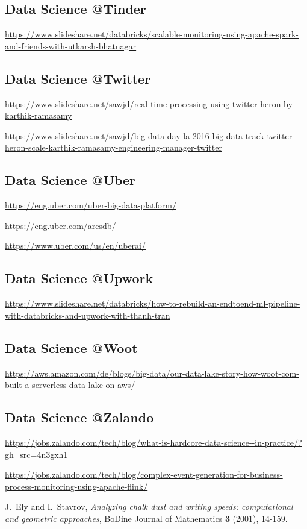 \documentclass[12pt]{scrartcl} %
\begin{document}
\subsection{Data Science @Tinder}
\url{https://www.slideshare.net/databricks/scalable-monitoring-using-apache-spark-and-friends-with-utkarsh-bhatnagar}

\subsection{Data Science @Twitter}
\url{https://www.slideshare.net/sawjd/real-time-processing-using-twitter-heron-by-karthik-ramasamy}

\url{https://www.slideshare.net/sawjd/big-data-day-la-2016-big-data-track-twitter-heron-scale-karthik-ramasamy-engineering-manager-twitter}

\subsection{Data Science @Uber}
\url{https://eng.uber.com/uber-big-data-platform/}

\url{https://eng.uber.com/aresdb/}

\url{https://www.uber.com/us/en/uberai/}

\subsection{Data Science @Upwork}
\url{https://www.slideshare.net/databricks/how-to-rebuild-an-endtoend-ml-pipeline-with-databricks-and-upwork-with-thanh-tran}

\subsection{Data Science @Woot}
\url{https://aws.amazon.com/de/blogs/big-data/our-data-lake-story-how-woot-com-built-a-serverless-data-lake-on-aws/}

\subsection{Data Science @Zalando}
\url{https://jobs.zalando.com/tech/blog/what-is-hardcore-data-science--in-practice/?gh_src=4n3gxh1}

\url{https://jobs.zalando.com/tech/blog/complex-event-generation-for-business-process-monitoring-using-apache-flink/}


\newpage

\begin{thebibliography}{99}

J.~Ely and I.~Stavrov,
\emph{Analyzing chalk dust and writing speeds: computational and geometric approaches},
BoDine Journal of Mathematics \textbf{3} (2001), 14-159.

\end{thebibliography}


\listoffigures%
\listoftables%
\end{document}
